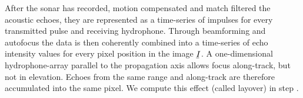 

After the sonar has recorded, motion compensated and match filtered the acoustic echoes, they are represented as a time-series of impulses for every transmitted pulse and receiving hydrophone. Through beamforming and autofocus the data is then coherently combined into a time-series of echo intensity values for every pixel position in the image $\ubar{I}$. A one-dimensional hydrophone-array parallel to the propagation axis allows focus along-track, but not in elevation. Echoes from the same range and along-track are therefore accumulated into the same pixel. We compute this effect (called layover) in step .



%  



